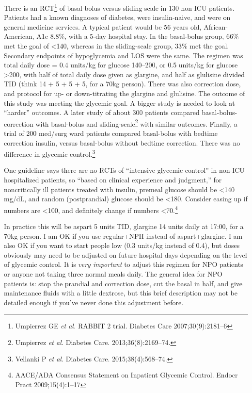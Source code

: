 \documentclass{article}
\begin{document}
There is an RCT\footnote{Umpierrez GE \emph{et al.} RABBIT 2
  trial. Diabetes Care 2007;30(9):2181--6} of basal-bolus versus
sliding-scale in 130 non-ICU patients. Patients had a known diagnoses
of diabetes, were insulin-naive, and were on general medicine
services. A typical patient would be 56 years old, African-American,
A1c 8.8\%, with a 5-day hospital stay. In the basal-bolus group, 66\%
met the goal of <140, whereas in the sliding-scale group, 33\% met the
goal. Secondary endpoints of hypoglycemia and LOS were the same. The
regimen was total daily dose = 0.4 units/kg for glucose 140--200, or
0.5 units/kg for glucose >200, with half of total daily dose given as
glargine, and half as glulisine divided TID (think 14 + 5 + 5 + 5, for
a 70kg person). There was also correction dose, and protocol for up-
or down-titrating the glargine and glulisine. The outcome of this
study was meeting the glycemic goal. A bigger study is needed to look
at ``harder'' outcomes. A later study of about 300 patients compared
basal-bolus-correction with basal-bolus and
sliding-scale\footnote{Umpierrez \emph{et al.}  Diabetes
  Care. 2013;36(8):2169--74.} with similar outcomes. Finally, a trial
of 200 med/surg ward patients compared basal-bolus with bedtime
correction insulin, versus basal-bolus without bedtime
correction. There was no difference in glycemic
control.\footnote{Vellanki P \emph{et al.} Diabetes
  Care. 2015;38(4):568--74.}

One guideline says there are no RCTs of ``intensive glycemic control''
in non-ICU hospitalized patients, so ``based on clinical experience
and judgment,'' for noncritically ill patients treated with insulin,
premeal glucose should be <140 mg/dL, and random (postprandial)
glucose should be <180. Consider easing up if numbers are <100, and
definitely change if numbers <70.\footnote{AACE/ADA Consensus
  Statement on Inpatient Glycemic Control. Endocr Pract
  2009;15(4):1--17}

In practice this will be aspart 5 units TID, glargine 14 units daily
at 17:00, for a 70kg person. I am OK if you use regular+NPH instead of
aspart+glargine. I am also OK if you want to start people low (0.3
units/kg instead of 0.4), but doses obviously may need to be adjusted
on future hospital days depending on the level of glycemic control. It
is \emph{very important} to adjust this regimen for NPO patients or
anyone not taking three normal meals daily. The general idea for NPO
patients is: stop the prandial and correction dose, cut the basal in
half, and give maintenance fluids with a little dextrose, but this
brief description may not be detailed enough if you've never done this
adjustment before.
\end{document}
